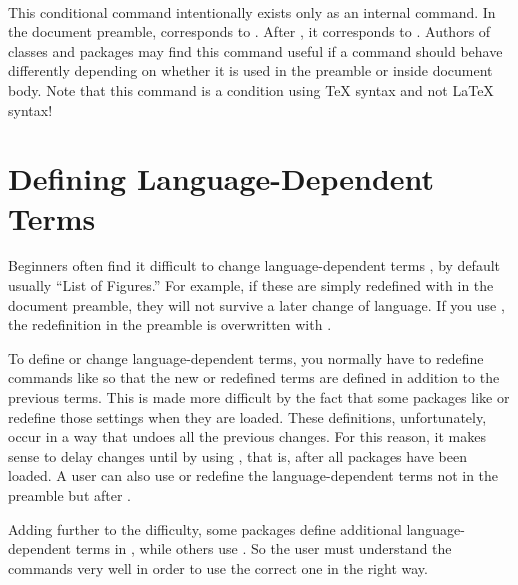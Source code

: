 \begin{Declaration}
  \ \ %
  \ \ 
\end{Declaration}
This conditional command intentionally exists only as an internal command. In
the document preamble,  corresponds to .
After , it corresponds to .
Authors of classes and packages may find this command useful if a command
should behave differently depending on whether it is used in the preamble or
inside document body. Note that this command is a
condition using \TeX{} syntax and not \LaTeX{} syntax!
%
\EndIndexGroup


\section{Defining Language-Dependent Terms}
\BeginIndexGroup
{}

Beginners often find it difficult to change language-dependent terms
, by default usually ``List of
Figures.'' For example, if these are simply redefined with
 in the document preamble, they will not survive a later
change of language. If you use , the
redefinition in the preamble is overwritten with
.

To define or change language-dependent terms, you normally have to redefine
commands like  so that the new or redefined terms are
defined in addition to the previous terms. This is made more difficult by the
fact that some packages like  or
 redefine those settings when they are
loaded. These definitions, unfortunately, occur in a way that undoes all the
previous changes. For this reason, it makes sense to delay changes until
 by using , that is,
after all packages have been loaded. A user can also use
 or redefine the language-dependent terms not in the
preamble but after .

Adding further to the difficulty, some packages define additional
language-dependent terms in , while others use
. So the user must understand the commands very
well in order to use the correct one in the right way.

